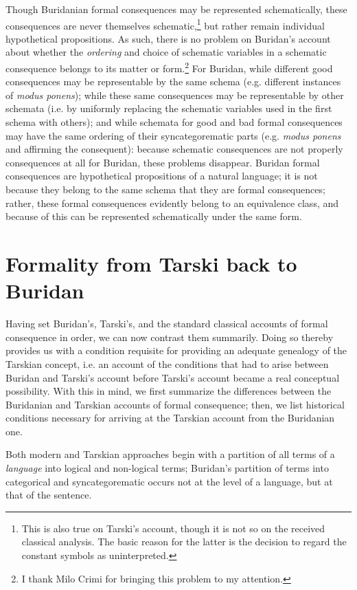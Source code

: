 \documentclass[]{article}
\begin{document}
Though Buridanian formal consequences may be represented schematically, these consequences are never themselves schematic,\footnote{This is also true on Tarski's account, though it is not so on the received classical analysis. The basic reason for the latter is the decision to regard the constant symbols as uninterpreted.} but rather remain individual hypothetical propositions. As such, there is no problem on Buridan's account about whether the \textit{ordering} and choice of schematic variables in a schematic consequence belongs to its matter or form.\footnote{I thank Milo Crimi for bringing this problem to my attention.} For Buridan, while different good consequences may be representable by the same schema (e.g. different instances of \textit{modus ponens}); while these same consequences may be representable by other schemata (i.e. by uniformly replacing the schematic variables used in the first schema with others); and while schemata for good and bad formal consequences may have the same ordering of their syncategorematic parts (e.g. \textit{modus ponens} and affirming the consequent): because schematic consequences are not properly consequences at all for Buridan, these problems disappear. Buridan formal consequences are hypothetical propositions of a natural language; it is not because they belong to the same schema that they are formal consequences; rather, these formal consequences evidently belong to an equivalence class, and because of this can be represented schematically under the same form.

\section{Formality from Tarski back to Buridan}
Having set Buridan's, Tarski's, and the standard classical accounts of formal consequence in order, we can now contrast them summarily. Doing so thereby provides us with a condition requisite for providing an adequate genealogy of the Tarskian concept, i.e. an account of the conditions that had to arise between Buridan and Tarski's account before Tarski's account became a real conceptual possibility. With this in mind, we first summarize the differences between the Buridanian and Tarskian accounts of formal consequence; then, we list historical conditions necessary for arriving at the Tarskian account from the Buridanian one.

Both modern and Tarskian approaches begin with a partition of all terms of a \textit{language} into logical and non-logical terms; Buridan's partition of terms into categorical and syncategorematic occurs not at the level of a language, but at that of the sentence. 
\end{document}
